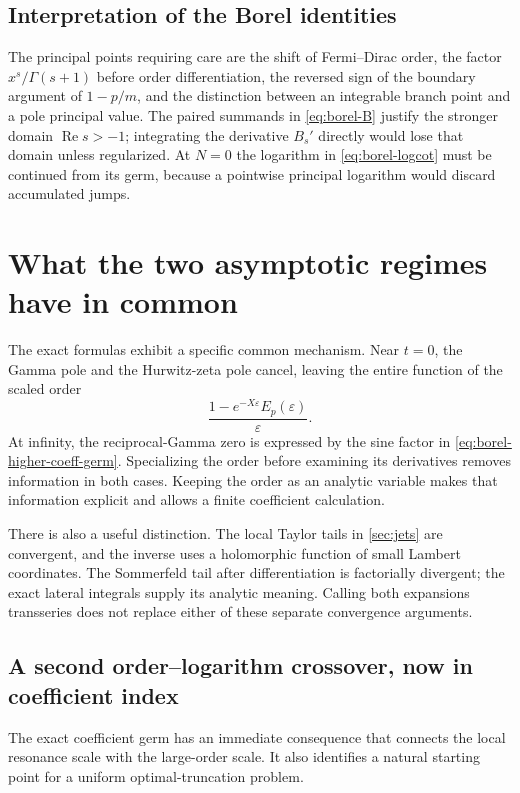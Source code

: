 \documentclass[11pt,a4paper]{article}
\numberwithin{equation}{section}
\theoremstyle{definition}
\theoremstyle{remark}
\newcommand{\eps}{\varepsilon}
\begin{document}
\subsection{Interpretation of the Borel identities}

The principal points requiring care are the shift of Fermi--Dirac order,
the factor $x^s/\Gamma(s+1)$ before order differentiation, the reversed
sign of the boundary argument of $1-p/m$, and the distinction between
an integrable branch point and a pole principal value. The paired
summands in \eqref{eq:borel-B} justify the stronger domain
$\operatorname{Re}s>-1$; integrating the derivative $B_s'$ directly
would lose that domain unless regularized. At $N=0$ the logarithm in
\eqref{eq:borel-logcot} must be continued from its germ, because a
pointwise principal logarithm would discard accumulated jumps.



\section{What the two asymptotic regimes have in common}
\label{sec:structure}

The exact formulas exhibit a specific common mechanism. Near $t=0$,
the Gamma pole and the Hurwitz-zeta pole cancel, leaving the entire
function of the scaled order
\[
 \frac{1-e^{-X\eps}E_p(\eps)}{\eps}.
\]
At infinity, the reciprocal-Gamma zero is expressed by the sine
factor in \eqref{eq:borel-higher-coeff-germ}. Specializing the order
before examining its derivatives removes information in both cases.
Keeping the order as an analytic variable makes that information
explicit and allows a finite coefficient calculation.

There is also a useful distinction. The local Taylor tails in
\cref{sec:jets} are convergent, and the inverse uses a holomorphic
function of small Lambert coordinates. The Sommerfeld tail after
differentiation is factorially divergent; the exact lateral integrals
supply its analytic meaning. Calling both expansions transseries does
not replace either of these separate convergence arguments.

\subsection{A second order--logarithm crossover, now in coefficient index}

The exact coefficient germ has an immediate consequence that connects
the local resonance scale with the large-order scale. It also identifies
a natural starting point for a uniform optimal-truncation problem.
\end{document}
